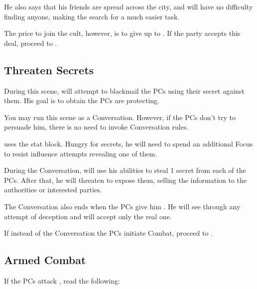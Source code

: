 He also says that his friends are spread across the city, and will have no difficulty finding anyone, making the search for \npcInformant{} a much easier task.

The price to join the cult, however, is to give up \lootSealedMessage{} to \npcBlindBeggar{}. If the party accepts this deal, proceed to .


\subsection{Threaten Secrets}
\label{ssec:2ndMeetingThreaten}

During this scene, \npcBlindBeggar{} will attempt to blackmail the PCs using their secret against them. His goal is to obtain \lootSealedMessage{} the PCs are protecting.

You may run this scene as a Conversation. However, if the PCs don't try to persuade him, there is no need to invoke Conversation rules.

\npcBlindBeggar{} uses the \enemyCorruptedLightweaverC{} stat block. 
Hungry for secrets, he will need to spend an additional Focus to resist influence attempts revealing one of them.

During the Conversation, \npcBlindBeggar{} will use his abilities to steal 1 secret from each of the PCs. After that, he will threaten to expose them, selling the information to the authorities or interested parties.

The Conversation also ends when the PCs give him \lootSealedMessage{}. He will see through any attempt of deception and will accept only the real one.

If instead of the Conversation the PCs initiate Combat, proceed to .





\subsection{Armed Combat}
\label{ssec:2ndMeetingCombat}

If the PCs attack \npcBlindBeggar{}, read the following:

